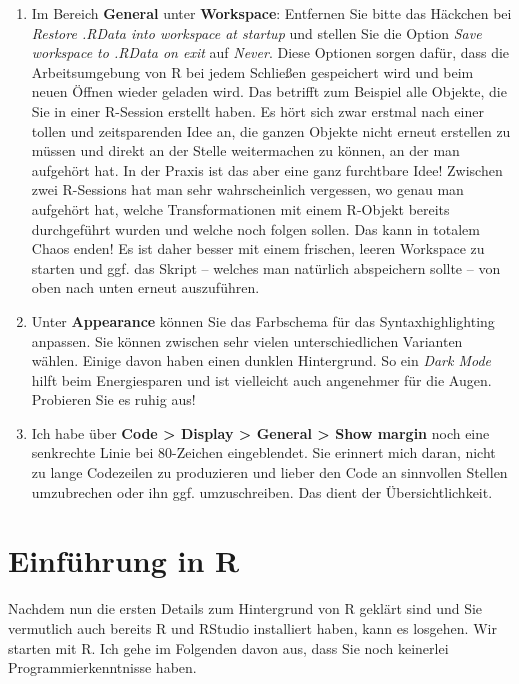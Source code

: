 \documentclass[
]{book}
\begin{document}
\begin{enumerate}
\def\labelenumi{\arabic{enumi}.}
\item
  Im Bereich \textbf{General} unter \textbf{Workspace}: Entfernen Sie bitte das Häckchen bei \emph{Restore .RData into workspace at startup} und stellen Sie die Option \emph{Save workspace to .RData on exit} auf \emph{Never}. Diese Optionen sorgen dafür, dass die Arbeitsumgebung von R bei jedem Schließen gespeichert wird und beim neuen Öffnen wieder geladen wird. Das betrifft zum Beispiel alle Objekte, die Sie in einer R-Session erstellt haben. Es hört sich zwar erstmal nach einer tollen und zeitsparenden Idee an, die ganzen Objekte nicht erneut erstellen zu müssen und direkt an der Stelle weitermachen zu können, an der man aufgehört hat. In der Praxis ist das aber eine ganz furchtbare Idee! Zwischen zwei R-Sessions hat man sehr wahrscheinlich vergessen, wo genau man aufgehört hat, welche Transformationen mit einem R-Objekt bereits durchgeführt wurden und welche noch folgen sollen. Das kann in totalem Chaos enden! Es ist daher besser mit einem frischen, leeren Workspace zu starten und ggf. das Skript -- welches man natürlich abspeichern sollte -- von oben nach unten erneut auszuführen.
\item
  Unter \textbf{Appearance} können Sie das Farbschema für das Syntaxhighlighting anpassen. Sie können zwischen sehr vielen unterschiedlichen Varianten wählen. Einige davon haben einen dunklen Hintergrund. So ein \emph{Dark Mode} hilft beim Energiesparen und ist vielleicht auch angenehmer für die Augen. Probieren Sie es ruhig aus!
\item
  Ich habe über \textbf{Code \textgreater{} Display \textgreater{} General \textgreater{} Show margin} noch eine senkrechte Linie bei 80-Zeichen eingeblendet. Sie erinnert mich daran, nicht zu lange Codezeilen zu produzieren und lieber den Code an sinnvollen Stellen umzubrechen oder ihn ggf. umzuschreiben. Das dient der Übersichtlichkeit.
\end{enumerate}

\hypertarget{einfuxfchrung-in-r-1}{%
\chapter{Einführung in R}\label{einfuxfchrung-in-r-1}}

Nachdem nun die ersten Details zum Hintergrund von R geklärt sind und Sie vermutlich auch bereits R und RStudio installiert haben, kann es losgehen. Wir starten mit R. Ich gehe im Folgenden davon aus, dass Sie noch keinerlei Programmierkenntnisse haben.
\end{document}
